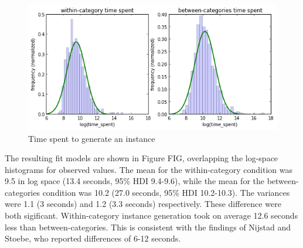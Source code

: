 \begin{figure}[h]
    \centering
    \includegraphics[width=0.9\columnwidth]{hyp5_comparison}
    \caption{Time spent to generate an instance}
\end{figure}

The resulting fit models are shown in Figure FIG, overlapping the log-space histograms for observed values. The mean for the within-category condition was 9.5 in log space (13.4 seconds, 95\% HDI 9.4-9.6), while the mean for the between-categories condition was 10.2 (27.0 seconds, 95\% HDI 10.2-10.3). The variances were 1.1 (3 seconds) and 1.2 (3.3 seconds) respectively. These difference were both sigificant. Within-category instance generation took on average 12.6 seconds less than between-categories. This is consistent with the findings of Nijstad and Stoebe, who reported differences of 6-12 seconds.
